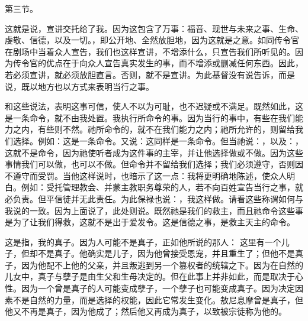 第三节。\par

这就是说，宣讲交托给了我。因为这包含了万事：福音、现世与未来之事、生命、虔敬、信德，以及一切。，即公开地、全然放胆地，因为这就是之意。如同传令官在剧场中当着众人宣告，我们也这样宣讲，不增添什么，只宣告我们所听见的。因为传令官的优点在于向众人宣告真实发生的事，而不增添或删减任何东西。因此，若必须宣讲，就必须放胆直言。否则，就不是宣讲。为此基督没有说告诉，而是说，既以地方也以方式来表明当行之事。\par

\par

和这些说法，表明这事可信，使人不以为可耻，也不迟疑或不满足。既然如此，这是一条命令，就不由我处置。我执行所命令的事。因为当行的事中，有些在我们能力之内，有些则不然。祂所命令的，就不在我们能力之内；祂所允许的，则留给我们选择。例如：这是一条命令。又说：这同样是一条命令。但当祂说：，以及：，这就不是命令，因为祂使听者成为这件事的主宰，并让他选择做或不做。因为这些事情我们可以做，也可以不做。但命令并不留给我们选择；我们必须遵守，否则因不遵守而受罚。当他这样说时，也暗示了这一点：我将更明确地陈述，使众人明白。例如：受托管理教会、并蒙主教职务尊荣的人，若不向百姓宣告当行之事，就必负责。但平信徒并无此责任。为此保禄也说：，我这样做。请看这些称谓如何与我说的一致。因为上面说了，此处则说。既然祂是我们的救主，而且祂命令这些事是为了让我们得救，这就不是出于爱发令。这是信德之事，是救主天主的命令。\par

 这是指，我的真子。因为人可能不是真子，正如他所说的那人： 这里有一个儿子，但却不是真子。他确实是儿子，因为他曾接受恩宠，并且重生了；但他不是真子，因为他配不上他的父亲，并且叛逃到另一个篡权者的统辖之下。因为在自然的儿女中，真子与孽子是由生父和生母决定的。但在此事上并非如此，而是取决于心性。因为一个曾是真子的人可能变成孽子，一个孽子也可能变成真子。因为决定因素不是自然的力量，而是选择的权能，因此它常发生变化。敖尼息摩曾是真子，但他又不再是真子，因为他成了；然后他又再成为真子，以致被宗徒称为他的。\par

